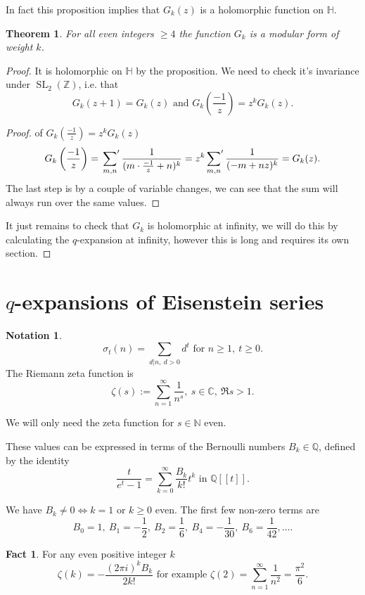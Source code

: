 \documentclass{article}
\newtheorem*{thm}{Theorem}
\theoremstyle{definition}
\newtheorem*{nota}{Notation}
\newtheorem*{fact}{Fact}
\DeclareMathOperator{\SL}{SL}
\begin{document}
In fact this proposition implies that $G_k(z)$ is a holomorphic function on $\mathbb{H}$.

\begin{thm}
For all even integers $\ge 4$ the function $G_k$ is a modular form of weight $k$.
\end{thm}

\begin{proof}
It is holomorphic on $\mathbb{H}$ by the proposition.
We need to check it's invariance under $\SL_2(\mathbb{Z})$, i.e. that
\[G_k(z+1) = G_k(z) \text{ and } G_k\left(\frac{-1}{z}\right) = z^kG_k(z).\]
\begin{proof} of $G_k(\frac{-1}{z}) = z^kG_k(z)$
\[G_k\left(\frac{-1}{z}\right) = \sideset{}{'}\sum_{m,n} \frac{1}{(m\cdot\frac{-1}{z} + n)^k} = z^k\sideset{}{'}\sum_{m,n}\frac{1}{(-m + nz)^k} = G_k(z).\]
The last step is by a couple of variable changes, we can see that the sum will always run over the same values.
\end{proof}

It just remains to check that $G_k$ is holomorphic at infinity, we will do this by calculating the $q$-expansion at infinity, however this is long and requires its own section.
\end{proof}

\section{$q$-expansions of Eisenstein series}
\begin{nota}
\[\sigma_t(n) = \sum_{d|n,\ d > 0} d^t \text{ for } n\ge 1,\ t\ge 0.\]
The Riemann zeta function is
\[\zeta(s) := \sum_{n=1}^{\infty} \frac{1}{n^s},\ s\in\mathbb{C},\ \Re s > 1.\]
\end{nota}

We will only need the zeta function for $s\in \mathbb{N}$ even.

These values can be expressed in terms of the Bernoulli numbers $B_k\in\mathbb{Q}$, defined by the identity
\[\frac{t}{e^t - 1} = \sum_{k=0}^{\infty}\frac{B_k}{k!}t^k\text{ in } \mathbb{Q}[[t]].\]

We have $B_k\ne 0\iff k=1$ or $k\ge 0$ even.
The first few non-zero terms are
\[B_0 = 1,\ B_1= -\frac{1}{2},\ B_2=\frac{1}{6},\ B_4=-\frac{1}{30},\ B_6=\frac{1}{42},\ldots.\]

\begin{fact}
For any even positive integer $k$
\[\zeta(k) = -\frac{(2\pi i)^kB_k}{2k!}\text{ for example } \zeta(2) = \sum_{n=1}^\infty \frac{1}{n^2} = \frac{\pi^2}{6}.\]
\end{fact}
\end{document}
